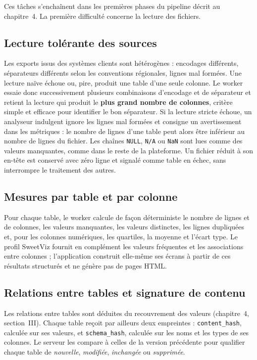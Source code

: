 Ces tâches s'enchaînent dans les premières phases du pipeline décrit au chapitre~4. La première difficulté concerne la lecture des fichiers.

\subsection{Lecture tolérante des sources}

Les exports issus des systèmes clients sont hétérogènes : encodages différents, séparateurs différents selon les conventions régionales, lignes mal formées. Une lecture naïve échoue ou, pire, produit une table d'une seule colonne. Le worker essaie donc successivement plusieurs combinaisons d'encodage et de séparateur et retient la lecture qui produit le \textbf{plus grand nombre de colonnes}, critère simple et efficace pour identifier le bon séparateur. Si la lecture stricte échoue, un analyseur indulgent ignore les lignes mal formées et consigne un avertissement dans les métriques : le nombre de lignes d'une table peut alors être inférieur au nombre de lignes du fichier. Les chaînes \texttt{NULL}, \texttt{N/A} ou \texttt{NaN} sont lues comme des valeurs manquantes, comme dans le reste de la plateforme. Un fichier réduit à son en-tête est conservé avec zéro ligne et signalé comme table en échec, sans interrompre le traitement des autres.

\subsection{Mesures par table et par colonne}

Pour chaque table, le worker calcule de façon déterministe le nombre de lignes et de colonnes, les valeurs manquantes, les valeurs distinctes, les lignes dupliquées et, pour les colonnes numériques, les quartiles, la moyenne et l'écart type. Le profil SweetViz fournit en complément les valeurs fréquentes et les associations entre colonnes ; l'application construit elle-même ses écrans à partir de ces résultats structurés et ne génère pas de pages HTML.

\subsection{Relations entre tables et signature de contenu}

Les relations entre tables sont déduites du recouvrement des valeurs (chapitre~4, section~III). Chaque table reçoit par ailleurs deux empreintes : \texttt{content\_hash}, calculée sur ses valeurs, et \texttt{schema\_hash}, calculée sur les noms et les types de ses colonnes. Le serveur les compare à celles de la version précédente pour qualifier chaque table de \textit{nouvelle}, \textit{modifiée}, \textit{inchangée} ou \textit{supprimée}.

